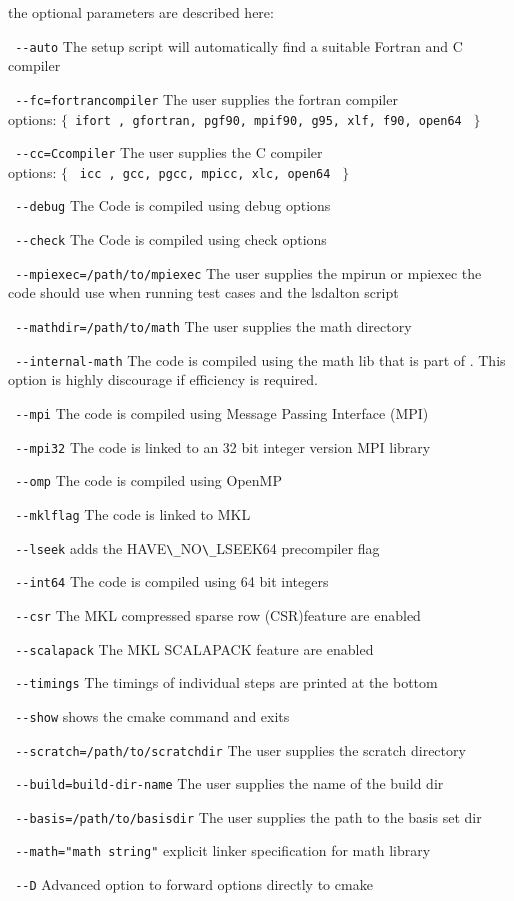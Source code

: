 the optional parameters are described here:
\begin{description}
\item \verb| --auto|     The setup script will automatically find a suitable Fortran and C compiler
\item   \verb| --fc=fortrancompiler|     The user supplies the fortran compiler\\
 options: $\{ $\verb| ifort , gfortran, pgf90, mpif90, g95, xlf, f90, open64 | $\}$
\item   \verb| --cc=Ccompiler|     The user supplies the C compiler\\
 options: $\{$ \verb| icc , gcc, pgcc, mpicc, xlc, open64 | $\}$
\item  \verb| --debug| The Code is compiled using debug options
\item  \verb| --check| The Code is compiled using check options
\item   \verb| --mpiexec=/path/to/mpiexec|     The user supplies the mpirun or mpiexec the code should use when running test cases and the lsdalton script
\item   \verb| --mathdir=/path/to/math|     The user supplies the math directory
\item   \verb| --internal-math|     The code is compiled using the math lib that is part of {\lsdalton}. This option is highly discourage if efficiency is required. 
\item   \verb| --mpi|     The code is compiled using Message Passing Interface (MPI) 
\item   \verb| --mpi32|     The code is linked to an 32 bit integer version MPI library 
\item   \verb| --omp|     The code is compiled using OpenMP
\item   \verb| --mklflag|     The code is linked to MKL
\item   \verb| --lseek|     adds the HAVE\verb|\_|NO\verb|\_|LSEEK64 precompiler flag
\item   \verb| --int64|     The code is compiled using 64 bit integers
\item   \verb| --csr|     The MKL compressed sparse row (CSR)feature are enabled
\item   \verb| --scalapack|     The MKL SCALAPACK feature are enabled
\item   \verb| --timings|     The timings of individual steps are printed at the bottom
\item   \verb| --show|     shows the cmake command and exits
\item   \verb| --scratch=/path/to/scratchdir|     The user supplies the scratch directory
\item   \verb| --build=build-dir-name|     The user supplies the name of the build dir
\item   \verb| --basis=/path/to/basisdir|     The user supplies the path to the basis set dir
\item   \verb| --math="math string"|     explicit linker specification for math library
\item  \verb| --D| Advanced option to forward options directly to cmake
\end{description}

